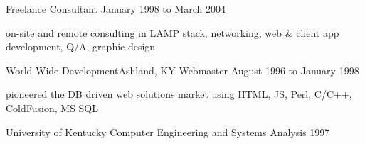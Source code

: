 \documentclass[10pt]{article}
\begin{document}
\sectionheader
{Freelance}{}
{Consultant}
{January 1998 to March 2004}
\begin{longtext}
on-site and remote consulting in LAMP stack, networking, web \& client app development, Q/A, graphic design
\end{longtext}

\sectionheader
{World Wide Development}{Ashland, KY}
{Webmaster}
{August 1996 to January 1998}
\begin{longtext}
pioneered the DB driven web solutions market using HTML, JS, Perl, C/C++, ColdFusion, MS SQL
\end{longtext}


\sectionheader
{University of Kentucky}
{}
{Computer Engineering and Systems Analysis}
{1997}
\fix
\end{document}
